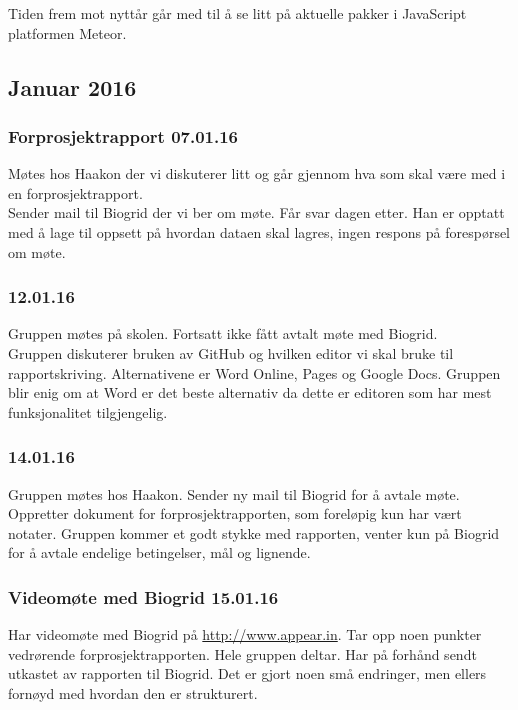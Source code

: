 \documentclass[12pt, oneside]{article}
\begin{document}
Tiden frem mot nyttår går med til å se litt på aktuelle pakker i JavaScript platformen Meteor. 


\subsection{Januar 2016}

\subsubsection{Forprosjektrapport 07.01.16}
Møtes hos Haakon der vi diskuterer litt og går gjennom hva som skal være med i en forprosjektrapport.\\
Sender mail til Biogrid der vi ber om møte. Får svar dagen etter. Han er opptatt med å lage til oppsett på hvordan dataen skal lagres, ingen respons på forespørsel om møte.



\subsubsection{12.01.16}
Gruppen møtes på skolen. Fortsatt ikke fått avtalt møte med Biogrid. \\
Gruppen diskuterer bruken av GitHub og hvilken editor vi skal bruke til rapportskriving. Alternativene er Word Online, Pages og Google Docs. Gruppen blir enig om at Word er det beste alternativ da dette er editoren som har mest funksjonalitet tilgjengelig. 



\subsubsection{14.01.16}
Gruppen møtes hos Haakon. Sender ny mail til Biogrid for å avtale møte. \\
Oppretter dokument for forprosjektrapporten, som foreløpig kun har vært notater. Gruppen kommer et godt stykke med rapporten, venter kun på Biogrid for å avtale endelige betingelser, mål og lignende.



\subsubsection{Videomøte med Biogrid 15.01.16}
Har videomøte med Biogrid på \url{http://www.appear.in}. Tar opp noen punkter vedrørende forprosjektrapporten. Hele gruppen deltar. Har på forhånd sendt utkastet av rapporten til Biogrid. Det er gjort noen små endringer, men ellers fornøyd med hvordan den er strukturert. \\
\end{document}
